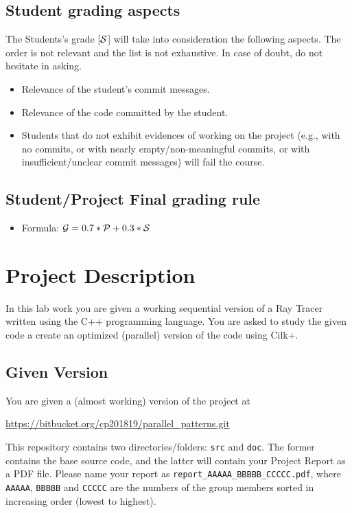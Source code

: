 \documentclass[11pt]{article}
\begin{document}
\subsection{Student grading aspects}

The Students's grade [$\cal{S}$] will take into consideration the following aspects.  The order is not relevant and the list is not exhaustive. In case of doubt, do not hesitate in asking.

\begin{itemize}
  \item Relevance of the student's commit messages.
  \item Relevance of the code committed by the student.
  \item Students that do not exhibit evidences of working on the project (e.g., with no commits, or with nearly empty/non-meaningful commits, or with insufficient/unclear commit messages) will fail the course.
\end{itemize}


\subsection{Student/Project Final grading rule}

\begin{itemize}
  \item Formula: ${\cal G} = 0.7 * {\cal P} + 0.3 * {\cal S}$
\end{itemize}


\section{Project Description}

In this lab work you are given a working sequential version of a Ray Tracer written using the C++ programming language.
You are asked to study the given code a create an optimized (parallel) version of the code using Cilk+.

\subsection{Given Version}

You are given a (almost working) version of the project at

\url{https://bitbucket.org/cp201819/parallel_patterns.git}


This repository contains two directories/folders: \verb!src! and \verb!doc!.  The former contains the base source code, and the latter will contain your Project Report as a PDF file.  Please name your report as \verb!report_AAAAA_BBBBB_CCCCC.pdf!, where \verb!AAAAA!,  \verb!BBBBB! and  \verb!CCCCC! are the numbers of the group members sorted in increasing order (lowest to highest).
\end{document}
